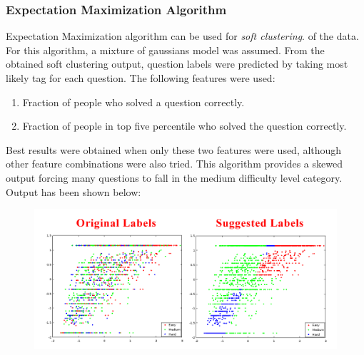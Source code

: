 \documentclass[12pt]{article}
\begin{document}
	
	\newpage
	\subsubsection{Expectation Maximization Algorithm}
	Expectation Maximization algorithm can be used for \textit{soft clustering}.
	of the data. For this algorithm, a mixture of gaussians model was assumed.
	From the obtained soft clustering output, question labels were predicted
	by taking most likely tag for each question. The following features were used:
	\begin{enumerate}
	\item Fraction of people who solved a question correctly.
	\item Fraction of people in top five percentile who solved the question
	correctly.
	\end{enumerate}
	
	Best results were obtained when only these two features were used, 
	although other feature combinations were also tried. This algorithm provides
	a skewed output forcing many questions to fall in the medium difficulty
	level category. Output has been shown below:
	\begin{figure}[h]
	\includegraphics[width=\textwidth]{EMOutput}
	\end{figure}
	
\end{document}
